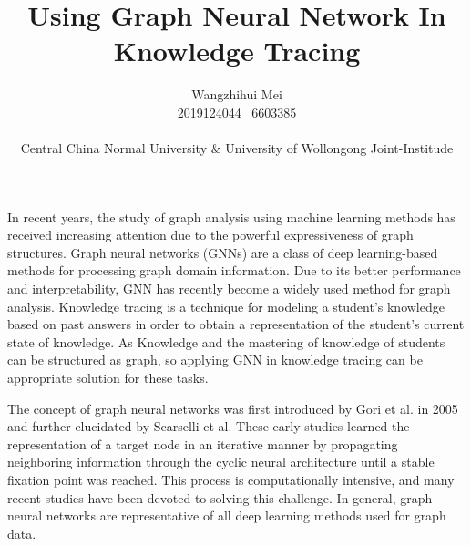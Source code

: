 \documentclass[a4paper,11pt]{article}
\begin{document}
\title{Using Graph Neural Network In Knowledge Tracing}
\author{Wangzhihui Mei \\ 2019124044 \ 6603385
\\ \\
Central China Normal University \& 
University of Wollongong Joint-Institude}


\date{}

\maketitle
\thispagestyle{empty}
\clearpage


\newpage
\setcounter{page}{1} %

In recent years, the study of graph analysis using machine learning methods has received increasing attention due to the powerful expressiveness of graph structures. Graph neural networks (GNNs) are a class of deep learning-based methods for processing graph domain information. Due to its better performance and interpretability\cite{lin2020graph,xie2018crystal}, GNN has recently become a widely used method for graph analysis. Knowledge tracing is a technique for modeling a student's knowledge based on past answers in order to obtain a representation of the student's current state of knowledge. As Knowledge and the mastering of knowledge of students can be structured as graph, so applying GNN in knowledge tracing can be appropriate solution for these tasks.

The concept of graph neural networks was first introduced by Gori et al. in 2005\cite{gori2005new} and further elucidated by Scarselli et al.\cite{scarselli2008graph} These early studies learned the representation of a target node in an iterative manner by propagating neighboring information through the cyclic neural architecture until a stable fixation point was reached. This process is computationally intensive, and many recent studies have been devoted to solving this challenge. In general, graph neural networks are representative of all deep learning methods used for graph data.
\end{document}
